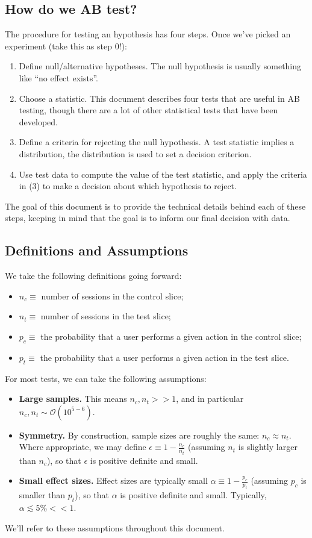 \documentclass{article}
\numberwithin{equation}{section}
\begin{document}
\subsection{How do we AB test?}
The procedure for testing an hypothesis has four steps. Once we've picked an experiment (take this as step 0!):
\begin{enumerate}
	\item Define null/alternative hypotheses. The null hypothesis is usually something like ``no effect exists''.
	\item Choose a statistic. This document describes four tests that are useful in AB testing, though there are a lot of other statistical tests that have been developed.
	\item Define a criteria for rejecting the null hypothesis. A test statistic implies a distribution, the distribution is used to set a decision criterion.
	\item Use test data to compute the value of the test statistic, and apply the criteria in (3) to make a decision about which hypothesis to reject.
\end{enumerate}
The goal of this document is to provide the technical details behind each of these steps, keeping in mind that the goal is to inform our final decision with data.

\subsection{Definitions and Assumptions \label{assumptions}}
We take the following definitions going forward:
\begin{itemize}
	\item $n_c \equiv $ number of sessions in the control slice;
	\item $n_t \equiv $ number of sessions in the test slice;
	\item $p_c \equiv$ the probability that a user performs a given action in the control slice; 
	\item $p_t \equiv$ the probability that a user performs a given action in the test slice.
\end{itemize}
For most tests, we can take the following assumptions:
\begin{itemize}
	\item \textbf{Large samples.} This means $n_c, n_t >> 1$, and in particular $n_c, n_t \sim \mathcal{O}\left(10^{5-6}\right)$.
	\item \textbf{Symmetry.} By construction, sample sizes are roughly the same: $n_c \approx n_t$. Where appropriate, we may define $\epsilon \equiv 1 - \frac{n_c}{n_t}$ (assuming $n_t$ is slightly larger than $n_c$), so that $\epsilon$ is positive definite and small.
	\item \textbf{Small effect sizes.} Effect sizes are typically small $\alpha \equiv 1 - \frac{p_c}{p_t}$ (assuming $p_c$ is smaller than $p_t$), so that $\alpha$ is positive definite and small. Typically, $\alpha \lesssim 5\% << 1$.
\end{itemize}
We'll refer to these assumptions throughout this document.
\end{document}
